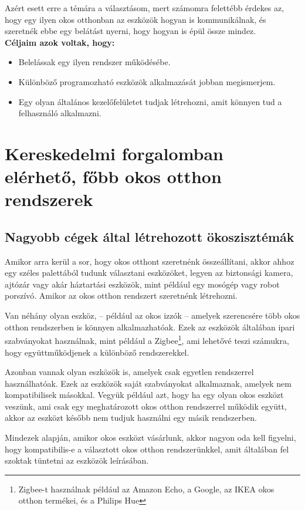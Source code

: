 \documentclass[
]{thesis-ekf}
\theoremstyle{definition}
\theoremstyle{remark}
\begin{document}
	Azért esett erre a témára a választásom, mert számomra felettébb érdekes az, hogy egy ilyen okos otthonban az eszközök hogyan is kommunikálnak, és szeretnék ebbe egy belátást nyerni, hogy hogyan is épül össze mindez.\\
	\textbf{Céljaim azok voltak, hogy:}
	\begin{itemize}
		\item Belelássak egy ilyen rendszer működésébe.
		\item Különböző programozható eszközök alkalmazását jobban megismerjem.
		\item Egy olyan általános kezelőfelületet tudjak létrehozni, amit könnyen tud a felhasználó alkalmazni.
	\end{itemize}
	
	\chapter{Kereskedelmi forgalomban elérhető, főbb okos otthon rendszerek}
	\section{Nagyobb cégek által létrehozott ökoszisztémák}
	Amikor arra kerül a sor, hogy okos otthont szeretnénk összeállítani, akkor ahhoz egy széles palettából tudunk választani eszközöket, legyen az biztonsági kamera, ajtózár vagy akár háztartási eszközök, mint például egy mosógép vagy robot porszívó. Amikor az okos otthon rendszert szeretnénk létrehozni.
	
	Van néhány olyan eszköz, -- például az okos izzók -- amelyek szerencsére több okos otthon rendszerben is könnyen alkalmazhatóak. Ezek az eszközök általában ipari szabványokat használnak, mint például a Zigbee\footnote{Zigbee-t használnak például az Amazon Echo, a Google, az IKEA okos otthon termékei, és a Philips Hue}, ami lehetővé teszi számukra, hogy együttműködjenek a különböző rendszerekkel. 
	
	Azonban vannak olyan eszközök is, amelyek csak egyetlen rendszerrel használhatóak. Ezek az eszközök saját szabványokat alkalmaznak, amelyek nem kompatibilisek másokkal. Vegyük például azt, hogy ha egy olyan okos eszközt veszünk, ami csak egy meghatározott okos otthon rendszerrel működik együtt, akkor az eszközt később nem tudjuk használni egy másik rendszerben.
	
	Mindezek alapján, amikor okos eszközt vásárlunk, akkor nagyon oda kell figyelni, hogy kompatibilis-e a választott okos otthon rendszerünkkel, amit általában fel szoktak tüntetni az eszközök leírásában.
			
\end{document}
